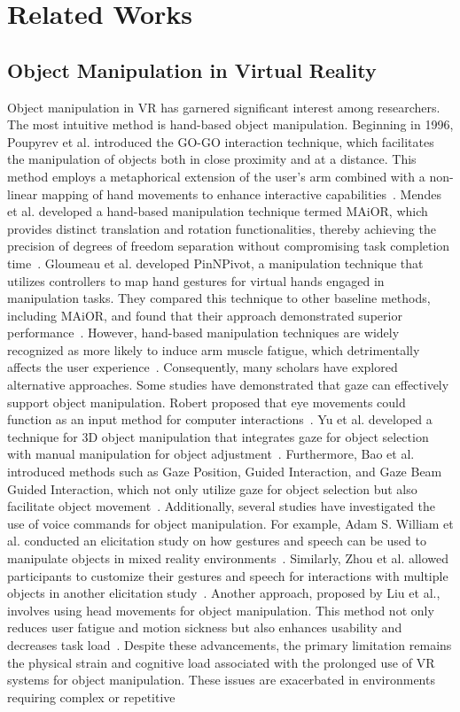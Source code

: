 \section{Related Works}
\subsection{Object Manipulation in Virtual Reality}
Object manipulation in VR has garnered significant interest among researchers. The most intuitive method is hand-based object manipulation. Beginning in 1996, Poupyrev et al. introduced the GO-GO interaction technique, which facilitates the manipulation of objects both in close proximity and at a distance. This method employs a metaphorical extension of the user's arm combined with a non-linear mapping of hand movements to enhance interactive capabilities~\cite{poupyrev1996go}. Mendes et al. developed a hand-based manipulation technique termed MAiOR, which provides distinct translation and rotation functionalities, thereby achieving the precision of degrees of freedom separation without compromising task completion time~\cite{mendes2017using}. Gloumeau et al. developed PinNPivot, a manipulation technique that utilizes controllers to map hand gestures for virtual hands engaged in manipulation tasks. They compared this technique to other baseline methods, including MAiOR, and found that their approach demonstrated superior performance~\cite{gloumeau2020pinnpivot}. However, hand-based manipulation techniques are widely recognized as more likely to induce arm muscle fatigue, which detrimentally affects the user experience~\cite{jang2017modeling,yu2021gaze}. Consequently, many scholars have explored alternative approaches. Some studies have demonstrated that gaze can effectively support object manipulation. Robert proposed that eye movements could function as an input method for computer interactions~\cite{jacob1990you}. Yu et al. developed a technique for 3D object manipulation that integrates gaze for object selection with manual manipulation for object adjustment~\cite{yu2021gaze}. Furthermore, Bao et al. introduced methods such as Gaze Position, Guided Interaction, and Gaze Beam Guided Interaction, which not only utilize gaze for object selection but also facilitate object movement~\cite{bao2023exploring}. Additionally, several studies have investigated the use of voice commands for object manipulation. For example, Adam S. William et al. conducted an elicitation study on how gestures and speech can be used to manipulate objects in mixed reality environments~\cite{williams2020understanding}. Similarly, Zhou et al. allowed participants to customize their gestures and speech for interactions with multiple objects in another elicitation study~\cite{zhou2022eliciting}. Another approach, proposed by Liu et al., involves using head movements for object manipulation. This method not only reduces user fatigue and motion sickness but also enhances usability and decreases task load~\cite{liu2024object}. Despite these advancements, the primary limitation remains the physical strain and cognitive load associated with the prolonged use of VR systems for object manipulation. These issues are exacerbated in environments requiring complex or repetitive 